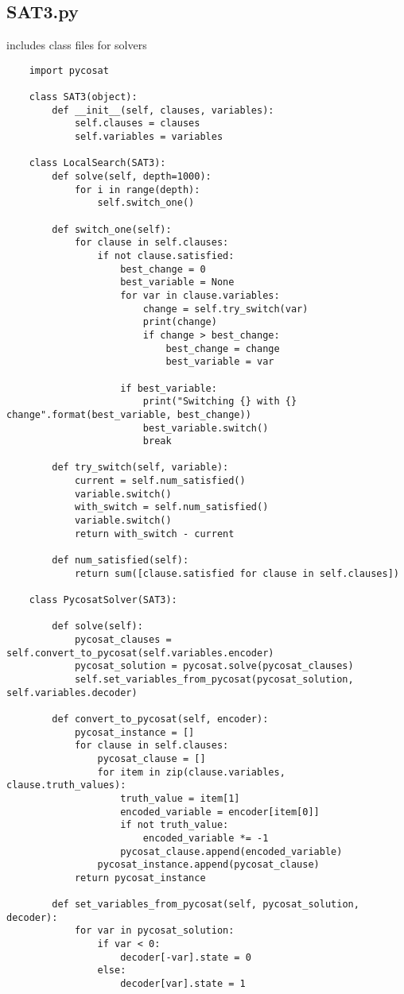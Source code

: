 \documentclass{article}
\theoremstyle{plain}
\numberwithin{theorem}{subsection}
\theoremstyle{definition}
\numberwithin{equation}{subsection}
\begin{document}
\subsection{SAT3.py}
includes class files for solvers
\begin{lstlisting}
    import pycosat
    
    class SAT3(object):
        def __init__(self, clauses, variables):
            self.clauses = clauses
            self.variables = variables
    
    class LocalSearch(SAT3):
        def solve(self, depth=1000):
            for i in range(depth):
                self.switch_one()
            
        def switch_one(self):
            for clause in self.clauses: 
                if not clause.satisfied:
                    best_change = 0
                    best_variable = None
                    for var in clause.variables:
                        change = self.try_switch(var)
                        print(change)
                        if change > best_change:
                            best_change = change
                            best_variable = var
    
                    if best_variable:
                        print("Switching {} with {} change".format(best_variable, best_change))
                        best_variable.switch()
                        break
    
        def try_switch(self, variable):
            current = self.num_satisfied()
            variable.switch()
            with_switch = self.num_satisfied()
            variable.switch()
            return with_switch - current
    
        def num_satisfied(self):
            return sum([clause.satisfied for clause in self.clauses])
    
    class PycosatSolver(SAT3):
    
        def solve(self):
            pycosat_clauses = self.convert_to_pycosat(self.variables.encoder)
            pycosat_solution = pycosat.solve(pycosat_clauses)
            self.set_variables_from_pycosat(pycosat_solution, self.variables.decoder)
    
        def convert_to_pycosat(self, encoder):
            pycosat_instance = []
            for clause in self.clauses:
                pycosat_clause = []
                for item in zip(clause.variables, clause.truth_values):
                    truth_value = item[1]
                    encoded_variable = encoder[item[0]]
                    if not truth_value:
                        encoded_variable *= -1
                    pycosat_clause.append(encoded_variable)
                pycosat_instance.append(pycosat_clause)
            return pycosat_instance
            
        def set_variables_from_pycosat(self, pycosat_solution, decoder):
            for var in pycosat_solution:
                if var < 0:
                    decoder[-var].state = 0
                else:
                    decoder[var].state = 1
\end{lstlisting}
\end{document}
